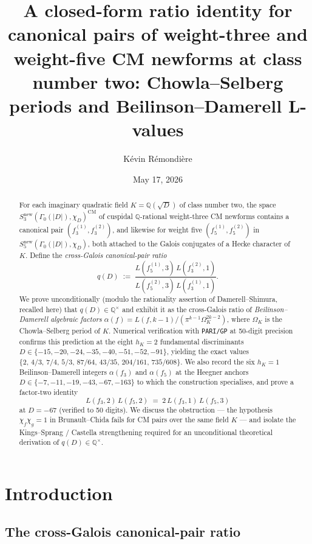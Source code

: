 \documentclass[11pt,a4paper]{amsart}
\title[Closed-form $q(D)$ at $h_K=2$]{A closed-form ratio identity for canonical pairs of weight-three
and weight-five CM newforms at class number two:
Chowla--Selberg periods and Beilinson--Damerell L-values}
\author{K\'evin R\'emondi\`ere}
\date{May 17, 2026}
\theoremstyle{plain}
\theoremstyle{definition}
\newcommand{\Q}{\mathbb{Q}}
\begin{document}
\begin{abstract}
For each imaginary quadratic field $K=\Q(\sqrt{D})$ of class number two, the
space $S_3^{\mathrm{new}}(\Gamma_0(|D|),\chi_D)^{\mathrm{CM}}$ of cuspidal
$\Q$-rational weight-three CM newforms contains a canonical pair
$(f_3^{(1)},f_3^{(2)})$, and likewise for weight five
$(f_5^{(1)},f_5^{(2)})$ in $S_5^{\mathrm{new}}(\Gamma_0(|D|),\chi_D)$, both
attached to the Galois conjugates of a Hecke character of $K$. Define the
\emph{cross-Galois canonical-pair ratio}
\[
  q(D) \;:=\;
  \frac{L(f_5^{(1)},3)\,L(f_3^{(2)},1)}{L(f_5^{(2)},3)\,L(f_3^{(1)},1)}.
\]
We prove unconditionally (modulo the rationality assertion of
Damerell--Shimura, recalled here) that $q(D)\in\Q^{\times}$ and exhibit it as
the cross-Galois ratio of \emph{Beilinson--Damerell algebraic factors}
$\alpha(f)=L(f,k-1)/(\pi^{k-1}\Omega_K^{2k-2})$, where $\Omega_K$ is the
Chowla--Selberg period of $K$. Numerical verification with
\texttt{PARI/GP} at 50-digit precision confirms this prediction at the eight
$h_K=2$ fundamental discriminants $D \in\{-15,-20,-24,-35,-40,-51,-52,-91\}$,
yielding the exact values
$\{2,\,4/3,\,7/4,\,5/3,\,87/64,\,43/35,\,204/161,\,735/608\}$. We also
record the six $h_K=1$ Beilinson--Damerell integers
$\alpha(f_3)$ and $\alpha(f_5)$ at the Heegner anchors
$D\in\{-7,-11,-19,-43,-67,-163\}$ to which the construction specialises, and
prove a factor-two identity
\[
  L(f_3,2)\,L(f_5,2) \;=\; 2\,L(f_3,1)\,L(f_5,3)
\]
at $D=-67$ (verified to 50 digits). We discuss the obstruction --- the
hypothesis $\chi_f\chi_g=1$ in Brunault--Chida \cite{BrunaultChida2015}
fails for CM pairs over the same field $K$ --- and isolate the
Kings--Sprang \cite{KingsSprang2025} / Castella \cite{Castella2025}
strengthening required for an unconditional theoretical derivation of
$q(D)\in\Q^{\times}$.
\end{abstract}

\maketitle

\section{Introduction}

\subsection{The cross-Galois canonical-pair ratio}
\end{document}
